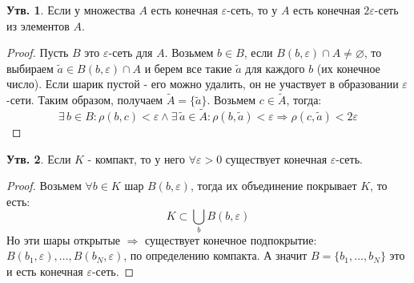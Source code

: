 \documentclass[12pt]{article}
\newcommand{\VN}{\varnothing}
\newcommand{\VE}{\varepsilon}
\theoremstyle{definition}
\newtheorem{prop}{Утв.}
\newcommand{\wte}[1]{\widetilde{#1}}
\begin{document}
\begin{prop}
	Если у множества $A$ есть конечная $\VE$-сеть, то у $A$ есть конечная $2\VE$-сеть из элементов $A$.
\end{prop}
\begin{proof}
	Пусть $B$ это $\VE$-сеть для $A$. Возьмем $b \in B$, если $B(b,\VE) \cap A \neq \VN$, то выбираем $\tilde{a} \in B(b,\VE) \cap A$ и берем все такие $\tilde{a}$ для каждого $b$ (их конечное число). Если шарик пустой - его можно удалить, он не участвует в образовании $\VE$-сети. Таким образом, получаем $\wte{A} = \{\tilde{a}\}$. Возьмем $c \in \wte{A}$, тогда:
	$$
		\exists \, b \in B \colon \rho(b,c) < \VE \wedge \exists \, \tilde{a} \in \wte{A} \colon \rho(b, \tilde{a}) < \VE \Rightarrow \rho(c, \tilde{a}) < 2\VE
	$$
\end{proof}
\begin{prop}
	Если $K$ - компакт, то у него $\forall \VE > 0$ существует конечная $\VE$-сеть.
\end{prop}
\begin{proof}
	Возьмем $\forall b \in K$ шар $B(b,\VE)$, тогда их объединение покрывает $K$, то есть: 
	$$
		K \subset \bigcup\limits_{b} B(b, \VE)
	$$ 
	Но эти шары открытые $\Rightarrow$ существует конечное подпокрытие: $B(b_1, \VE), \dotsc, B( b_N, \VE)$, по определению компакта. А значит $B = \{b_1, \dotsc, b_N\}$ это и есть конечная $\VE$-сеть.
\end{proof}
\end{document}
